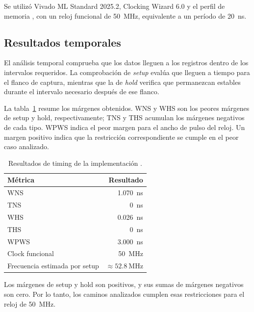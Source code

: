 Se utilizó Vivado ML Standard 2025.2, Clocking Wizard 6.0 y el perfil de
memoria , con un reloj funcional de \SI{50}{\mega\hertz},
equivalente a un período de \SI{20}{\nano\second}.

\subsection{Resultados temporales}

El análisis temporal comprueba que los datos lleguen a los registros dentro de
los intervalos requeridos. La comprobación de \emph{setup} evalúa que lleguen
a tiempo para el flanco de captura, mientras que la de \emph{hold} verifica que
permanezcan estables durante el intervalo necesario después de ese flanco.

La tabla~\ref{tab:resultados-timing} resume los márgenes obtenidos. WNS y WHS
son los peores márgenes de setup y hold, respectivamente; TNS y THS acumulan
los márgenes negativos de cada tipo. WPWS indica el peor margen para el ancho
de pulso del reloj. Un margen positivo indica que la restricción correspondiente
se cumple en el peor caso analizado.

\begin{table}[H]
  \centering
  \small
  \begin{tabular}{lr}
    \toprule
    \textbf{Métrica} & \textbf{Resultado} \\
    \midrule
    WNS & \SI[explicit-sign=+]{1.070}{\nano\second} \\
    TNS & \SI{0}{\nano\second} \\
    WHS & \SI[explicit-sign=+]{0.026}{\nano\second} \\
    THS & \SI{0}{\nano\second} \\
    WPWS & \SI[explicit-sign=+]{3.000}{\nano\second} \\
    Clock funcional & \SI{50}{\mega\hertz} \\
    Frecuencia estimada por setup & $\approx \SI{52.8}{\mega\hertz}$ \\
    \bottomrule
  \end{tabular}
  \caption{Resultados de timing de la implementación .}
  \label{tab:resultados-timing}
\end{table}

Los márgenes de setup y hold son positivos, y sus sumas de márgenes negativos
son cero. Por lo tanto, los caminos analizados cumplen esas restricciones para
el reloj de \SI{50}{\mega\hertz}.

